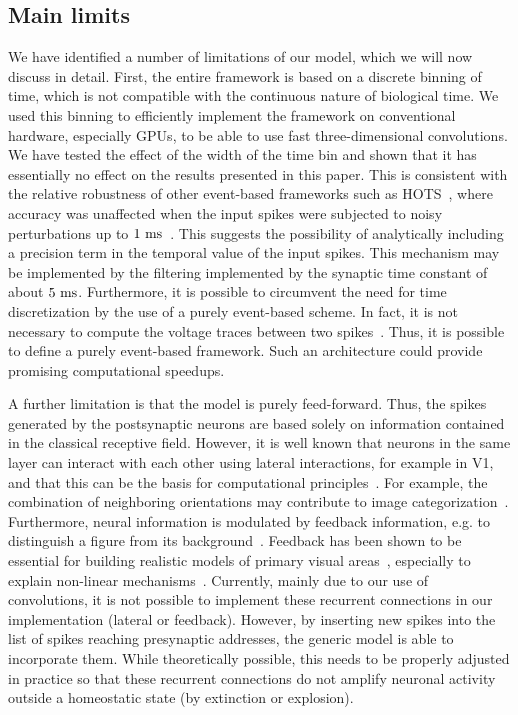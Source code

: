 \documentclass[default]{sn-jnl}%
\theoremstyle{thmstyleone}%
\theoremstyle{thmstyletwo}%
\theoremstyle{thmstylethree}%
\newcommand{\note}[1]{{\sethlcolor{yellow}\hl{#1}}}
\begin{document}
\subsection{Main limits}
We have identified a number of limitations of our model, which we will now discuss in detail. First, the entire framework is based on a discrete binning of time, which is not compatible with the continuous nature of biological time. We used this binning to efficiently implement the framework on conventional hardware, especially GPUs, to be able to use fast three-dimensional convolutions. We have tested the effect of the width of the time bin and shown that it has essentially no effect on the results presented in this paper. This is consistent with the relative robustness of other event-based frameworks such as HOTS~\citep{lagorce_hots_2017}, where accuracy was unaffected when the input spikes were subjected to noisy perturbations up to $1~\si{\milli\second}$~\citep{grimaldi_robust_2022}. This suggests the possibility of analytically including a precision term in the temporal value of the input spikes. This mechanism may be implemented by the filtering implemented by the synaptic time constant of about $5~\si{\milli\second}$. Furthermore, it is possible to circumvent the need for time discretization by the use of a purely event-based scheme. In fact, it is not necessary to compute the voltage traces between two spikes~\citep{hanuschkin_general_2010}. Thus, it is possible to define a purely event-based framework. Such an architecture could provide promising computational speedups. %

A further limitation is that the model is purely feed-forward. Thus, the spikes generated by the postsynaptic neurons are based solely on information contained in the classical receptive field. However, it is well known that neurons in the same layer can interact with each other using lateral interactions, for example in V1, and that this can be the basis for computational principles~\citep{chavane_revisiting_2022}. For example, the combination of neighboring orientations may contribute to image categorization~\citep{perrinet_edge_2015}. Furthermore, neural information is modulated by feedback information, e.g. to distinguish a figure from its background~\citep{roelfsema_early_2016}. Feedback has been shown to be essential for building realistic models of primary visual areas~\citep{boutin_sparse_2020, boutin_effect_2020}, especially to explain non-linear mechanisms~\citep{boutin_pooling_2022}. Currently, mainly due to our use of convolutions, it is not possible to implement these recurrent connections in our implementation (lateral or feedback). However, by inserting new spikes into the list of spikes reaching presynaptic addresses, the generic model is able to incorporate them. While theoretically possible, this needs to be properly adjusted in practice so that these recurrent connections do not amplify neuronal activity outside a homeostatic state (by extinction or explosion).
\end{document}
